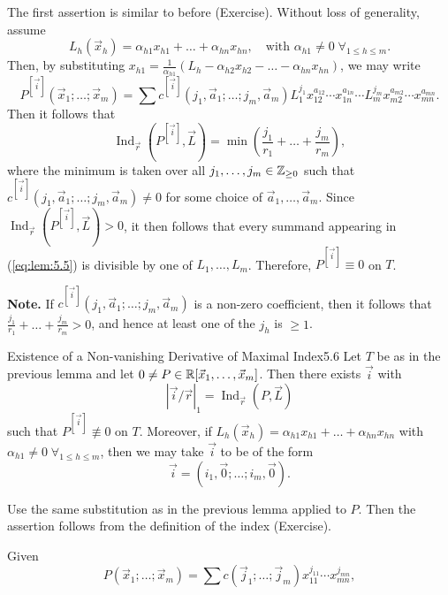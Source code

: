\documentclass{Vorlesungstemplate_English} %
\begin{document}
\begin{colorpf}
  \color{orange} The first assertion is similar to before (Exercise). Without loss of generality, assume
  \[ L_h(\vec x_h) = \alpha_{h1}x_{h1} + \dots + \alpha_{hn}x_{hn}, \quad \text{with } \alpha_{h1} \neq 0 \; \forall_{1 \leq h \leq m}.\]
  Then, by substituting $x_{h1} = \frac{1}{\alpha_{h1}}(L_h - \alpha_{h2}x_{h2} - \dots - \alpha_{hn}x_{hn})$, we may write
  \begin{equation}\label{eq:lem:5.5} P^{[\vec i]}(\vec x_1; \dots; \vec x_m) = \sum c^{[\vec i]}(j_1, \vec a_1; \dots; j_m, \vec a_m) L_1^{j_1}x_{12}^{a_{12}}\cdots x_{1n}^{a_{1n}}\cdots L_m^{j_m}x_{m2}^{a_{m2}}\cdots x_{mn}^{a_{mn}}. \tag{1}\end{equation}
  Then it follows that
  \[ \operatorname{Ind}_{\vec r}(P^{[\vec i]}, \vec L) = \min\left(\frac{j_1}{r_1} + \dots + \frac{j_m}{r_m}\right),\]
  where the minimum is taken over all $j_1, \dots, j_m \in \mathbb{Z}_{\geq 0}$ such that $c^{[\vec i]}(j_1, \vec a_1; \dots; j_m, \vec a_m) \neq 0$ for some choice of $\vec a_1, \dots, \vec a_m$. Since $\operatorname{Ind}_{\vec r}(P^{[\vec i]}, \vec L) > 0$, it then follows that every summand appearing in (\ref{eq:lem:5.5}) is divisible by one of $L_1, \dots, L_m$. Therefore, $P^{[\vec i]} \equiv 0$ on $T$.
\end{colorpf}
\noindent \textbf{Note.} If $c^{[\vec i]}(j_1, \vec a_1; \dots; j_m, \vec a_m)$ is a non-zero coefficient, then it follows that $\frac{j_1}{r_1} + \dots + \frac{j_m}{r_m} > 0$, and hence at least one of the $j_h$ is $\geq 1$.
\begin{lemma}[coltitle=orange]{\color{orange} Existence of a Non-vanishing Derivative of Maximal Index}{5.6}
  \color{orange} Let $T$ be as in the previous lemma and let $0 \neq P \in \mathbb{R}[\vec x_1, \dots, \vec x_m]$. Then there exists $\vec i$ with
  \[ \left|\vec i/\vec r\right|_1 = \operatorname{Ind}_{\vec r}(P, \vec L)\]
  such that $P^{[\vec i]} \not\equiv 0$ on $T$. Moreover, if $L_h(\vec x_h) = \alpha_{h1}x_{h1} + \dots + \alpha_{hn}x_{hn}$ with $\alpha_{h1} \neq 0 \; \forall_{1 \leq h \leq m}$, then we may take $\vec i$ to be of the form
  \[ \vec i = (i_1, \vec 0; \dots; i_m, \vec 0).\]
\end{lemma}
\begin{colorpf}
  \color{orange} Use the same substitution as in the previous lemma applied to $P$. Then the assertion follows from the definition of the index (Exercise).
\end{colorpf}
\noindent Given
\[ P(\vec x_1; \dots; \vec x_m) = \sum c(\vec j_1; \dots; \vec j_m) x_{11}^{j_{11}}\cdots x_{mn}^{j_{mn}},\]
\end{document}
